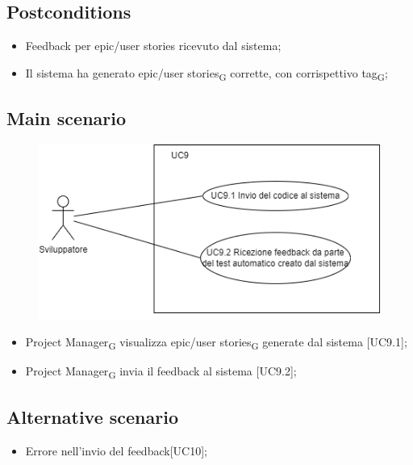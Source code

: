 \documentclass{article}
\begin{document}
    \subsection*{Postconditions}
        \begin{itemize}
            \item Feedback per epic/user stories ricevuto dal sistema;
            \item Il sistema ha generato epic/user stories\textsubscript{G} corrette, con corrispettivo tag\textsubscript{G};
        \end{itemize}
        
    \subsection*{Main scenario}
        \begin{figure}[h]
          \centering
          \includegraphics{./imgUML/UC9-zoom.png}
          \label{fig:immagine}
        \end{figure}

        \begin{itemize}
            \item Project Manager\textsubscript{G} visualizza epic/user stories\textsubscript{G} generate dal sistema [UC9.1];
            \item Project Manager\textsubscript{G} invia il feedback al sistema [UC9.2];
        \end{itemize}
        
    \subsection*{Alternative scenario}
        
        \begin{itemize}
            \item Errore nell'invio del feedback[UC10];
        \end{itemize}
        
\end{document}
